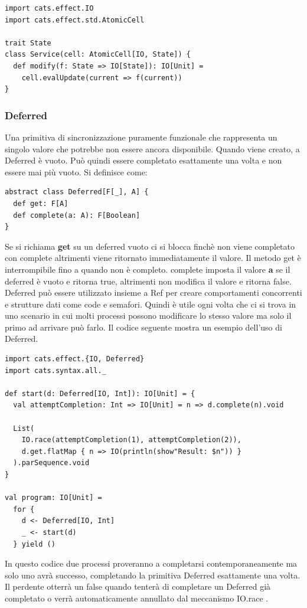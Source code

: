 \begin{verbatim}
import cats.effect.IO
import cats.effect.std.AtomicCell

trait State
class Service(cell: AtomicCell[IO, State]) {
  def modify(f: State => IO[State]): IO[Unit] = 
    cell.evalUpdate(current => f(current))
}
\end{verbatim}

\subsubsection{Deferred}
Una primitiva di sincronizzazione puramente funzionale che rappresenta un singolo valore che potrebbe non essere ancora disponibile. Quando viene creato, a Deferred è vuoto. Può quindi essere completato esattamente una volta e non essere mai più vuoto. Si definisce come:
\begin{verbatim}
abstract class Deferred[F[_], A] {
  def get: F[A]
  def complete(a: A): F[Boolean]
}
\end{verbatim}
\noindent Se si richiama \textbf{get} su un deferred vuoto ci si blocca finchè non viene completato con complete altrimenti viene ritornato immediatamente il valore. Il metodo get è interrompibile fino a quando non è completo. complete imposta il valore \textbf{a} se il deferred è vuoto e ritorna true, altrimenti non modifica il valore e ritorna false. Deferred può essere utilizzato insieme a Ref per creare comportamenti concorrenti e strutture dati come code e semafori. Quindi è utile ogni volta che ci si trova in uno
scenario in cui molti processi possono modificare lo stesso valore ma solo il primo ad
arrivare può farlo. Il codice seguente mostra un esempio dell'uso di Deferred.

\begin{verbatim}
import cats.effect.{IO, Deferred}
import cats.syntax.all._

def start(d: Deferred[IO, Int]): IO[Unit] = {
  val attemptCompletion: Int => IO[Unit] = n => d.complete(n).void

  List(
    IO.race(attemptCompletion(1), attemptCompletion(2)),
    d.get.flatMap { n => IO(println(show"Result: $n")) }
  ).parSequence.void
}

val program: IO[Unit] =
  for {
    d <- Deferred[IO, Int]
    _ <- start(d)
  } yield ()
\end{verbatim}

In questo codice due processi proveranno a completarsi contemporaneamente ma solo uno avrà successo, completando la primitiva Deferred esattamente una volta. Il perdente otterrà un  false quando tenterà di completare un Deferred già completato o verrà automaticamente annullato dal meccanismo IO.race .

